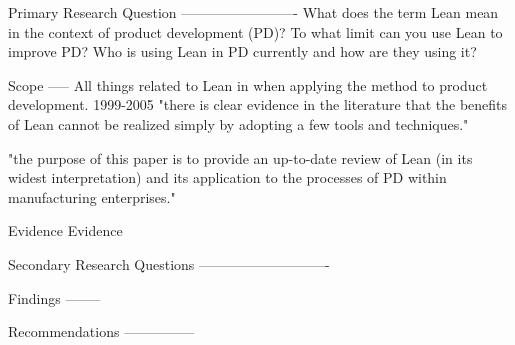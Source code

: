 Primary Research Question
-------------------------
What does the term Lean mean in the context of product development (PD)? To what limit can you use Lean to improve PD? Who is using Lean in PD currently and how are they using it?

Scope
-----
All things related to Lean in when applying the method to product development.
1999-2005
"there is clear evidence in the literature that
the benefits of Lean cannot be realized simply by
adopting a few tools and techniques."

"the purpose of this paper is to provide an up-to-date review of
Lean (in its widest interpretation) and its application
to the processes of PD within manufacturing
enterprises."

Evidence 
Evidence

Secondary Research Questions
----------------------------

Findings
--------

Recommendations
---------------
